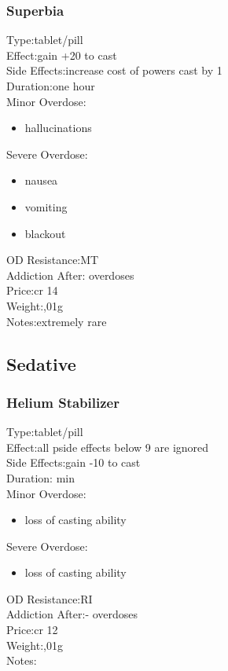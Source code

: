 \documentclass[12pt,a4paper,openany]{book}
\begin{document}
	\subsubsection{Superbia}
	Type:\tab tablet/pill\\
	Effect:\tab gain +20 to cast\\
	Side Effects:\tab increase cost of powers cast by 1\\
	Duration:\tab one hour\\
	Minor Overdose:\\
	\begin{itemize}
		\setlength\itemsep{-8mm}
		\vspace{-12mm}
		\item hallucinations
	\end{itemize}
	Severe Overdose:\\
	\begin{itemize}
		\setlength\itemsep{-8mm}
		\vspace{-12mm}
		\item nausea
		\item vomiting
		\item blackout
	\end{itemize}
	OD Resistance:\tab MT\\
	Addiction After: overdoses\\
	Price:\tab cr 14\\
	Weight:,01g\\
	Notes:\tab extremely rare
	
	\subsection{Sedative}
	\subsubsection{Helium Stabilizer}
	Type:\tab tablet/pill\\
	Effect:\tab all pside effects below 9 are ignored\\
	Side Effects:\tab gain -10 to cast\\
	Duration: min\\
	Minor Overdose:\\
	\begin{itemize}
		\setlength\itemsep{-8mm}
		\vspace{-12mm}
		\item loss of casting ability
	\end{itemize}
	Severe Overdose:\\
	\begin{itemize}
		\setlength\itemsep{-8mm}
		\vspace{-12mm}
		\item loss of casting ability
	\end{itemize}
	OD Resistance:\tab RI\\
	Addiction After:\tab - overdoses\\
	Price:\tab cr 12\\
	Weight:,01g\\
	Notes:\tab 
	
\end{document}
